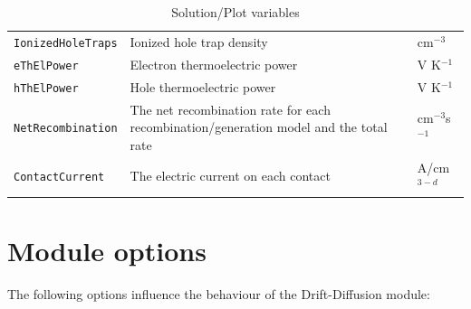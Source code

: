 \begin{table}[htb]
\begin{tabular}{l|p{8cm}|l}
\texttt{IonizedHoleTraps} & Ionized hole trap density & cm$^{-3}$ \\
\texttt{eThElPower} & Electron thermoelectric power & V K$^{-1}$ \\
\texttt{hThElPower} & Hole thermoelectric power & V K$^{-1}$ \\
\texttt{NetRecombination} & %
%
 The net recombination rate for each recombination/generation model and the total rate &
 cm$^{-3}$s$^{-1}$ \\
\texttt{ContactCurrent} & The electric current on each contact & A/cm$^{3-d}$
\end{tabular}
\caption{Solution/Plot variables}
\label{table:dd_solutions}
\end{table}


\section{Module options}

The following options influence the behaviour of the Drift-Diffusion module:

